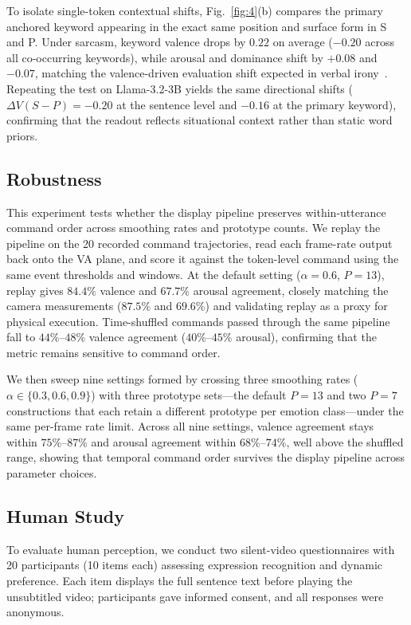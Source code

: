 \documentclass[letterpaper, 10 pt, conference]{ieeeconf}
\begin{document}
To isolate single-token contextual shifts, Fig.~\ref{fig:4}(b) compares the primary anchored keyword appearing in the exact same position and surface form in S and P. Under sarcasm, keyword valence drops by $0.22$ on average ($-0.20$ across all co-occurring keywords), while arousal and dominance shift by $+0.08$ and $-0.07$, matching the valence-driven evaluation shift expected in verbal irony~\cite{leggitt2000emotional}. Repeating the test on Llama-3.2-3B yields the same directional shifts ($\Delta V(S{-}P)=-0.20$ at the sentence level and $-0.16$ at the primary keyword), confirming that the readout reflects situational context rather than static word priors.


\subsection{Robustness}
This experiment tests whether the display pipeline preserves within-utterance command order across smoothing rates and prototype counts. We replay the pipeline on the 20 recorded command trajectories, read each frame-rate output back onto the VA plane, and score it against the token-level command using the same event thresholds and windows. At the default setting ($\alpha{=}0.6$, $P{=}13$), replay gives $84.4\%$ valence and $67.7\%$ arousal agreement, closely matching the camera measurements ($87.5\%$ and $69.6\%$) and validating replay as a proxy for physical execution. Time-shuffled commands passed through the same pipeline fall to $44\%$--$48\%$ valence agreement ($40\%$--$45\%$ arousal), confirming that the metric remains sensitive to command order.

We then sweep nine settings formed by crossing three smoothing rates ($\alpha\in\{0.3,0.6,0.9\}$) with three prototype sets---the default $P{=}13$ and two $P{=}7$ constructions that each retain a different prototype per emotion class---under the same per-frame rate limit. Across all nine settings, valence agreement stays within $75\%$--$87\%$ and arousal agreement within $68\%$--$74\%$, well above the shuffled range, showing that temporal command order survives the display pipeline across parameter choices.

\subsection{Human Study}
\label{sec:exp_human}
To evaluate human perception, we conduct two silent-video questionnaires with 20 participants (10 items each) assessing expression recognition and dynamic preference. Each item displays the full sentence text before playing the unsubtitled video; participants gave informed consent, and all responses were anonymous.
\end{document}
